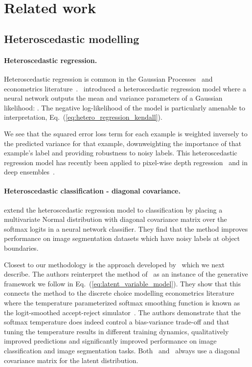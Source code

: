 \documentclass[final]{cvpr}
\begin{document}
\section{Related work}
\label{sec:related_work}

\subsection{Heteroscedastic modelling}

\paragraph{Heteroscedastic regression.}
Heteroscedastic regression is common in the Gaussian Processes~\cite{williams2006gaussian} and econometrics literature~\cite{train2009discrete}.~\citet{bishop1997regression} introduced a heteroscedastic regression model where a neural network outputs the mean and variance parameters of a Gaussian likelihood: . The negative log-likelihood of the model is particularly amenable to interpretation, Eq.\ (\ref{eq:hetero_regression_kendall}).

We see that the squared error loss term for each example is weighted inversely to the predicted variance for that example, downweighting the importance of that example's label and providing robustness to noisy labels. This heteroscedastic regression model has recently been applied to pixel-wise depth regression~\cite{kendall2017uncertainties} and in deep ensembles~\cite{lakshminarayanan2017simple}.

\paragraph{Heteroscedastic classification - diagonal covariance.}
\citet{kendall2017uncertainties} extend the heteroscedastic regression model to classification by placing a multivariate Normal distribution with diagonal covariance matrix over the softmax logits in a neural network classifier. They find that the method improves performance on image segmentation datasets which have noisy labels at object boundaries.

Closest to our methodology is the approach developed by~\citet{collier2020analysis} which we next describe. The authors reinterpret the method of~\citet{kendall2017uncertainties} as an instance of the generative framework we follow in Eq.\ (\ref{eq:latent_variable_model}). They show that this connects the method to the discrete choice modelling econometrics literature where the temperature parameterized softmax smoothing function is known as the logit-smoothed accept-reject simulator~\cite{train2009discrete,mcfadden1989method,bolduc1996multinomial}. The authors demonstrate that the softmax temperature does indeed control a bias-variance trade-off and that tuning the temperature results in different training dynamics, qualitatively improved predictions and significantly improved performance on image classification and image segmentation tasks. Both~\citet{kendall2017uncertainties} and~\citet{collier2020analysis} always use a diagonal covariance matrix for the latent distribution.
\end{document}

